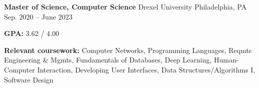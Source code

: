

\begin{cventries}

  \cventry
  {\textbf{Master of Science, Computer Science}} %
  {Drexel University} %
  {Philadelphia, PA} %
  {Sep. 2020 -- June 2023} %
  {
    \begin{cvitems} %
      \item {\textbf{GPA:} 3.62 / 4.00}
      \item {\color{darktext} \textbf{Relevant coursework:}
                  Computer Networks,
                  Programming Languages,
                  Reqmts Engineering \& Mgmts,
                  Fundamentals of Databases,
                  Deep Learning,
                  Human-Computer Interaction,
                  Developing User Interfaces,
                  Data Structures/Algorithms I,
                  Software Design
            }
    \end{cvitems}} 
    

\end{cventries}
